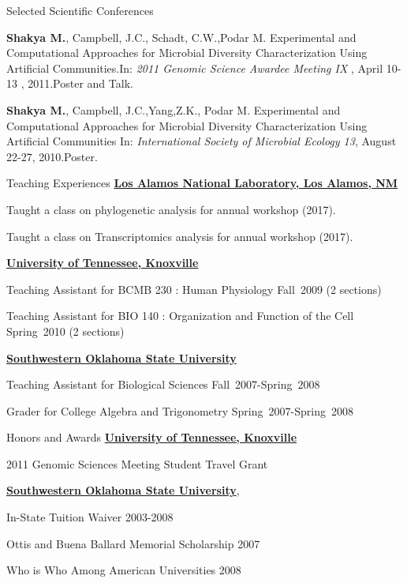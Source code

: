 \documentclass{resume} %
\begin{document}
\begin{rSection}{Selected Scientific Conferences}
\item \textbf{Shakya M.}, Campbell, J.C., Schadt, C.W.,Podar M. Experimental and Computational Approaches for Microbial Diversity Characterization Using Artificial Communities.In: \emph{2011 Genomic Science Awardee Meeting IX }, April 10-13 , 2011.Poster and Talk.

\item \textbf{Shakya M.}, Campbell, J.C.,Yang,Z.K., Podar M. Experimental and Computational Approaches for Microbial Diversity Characterization Using Artificial Communities In: \emph{International Society of Microbial Ecology 13}, August 22-27, 2010.Poster.

\end{rSection}
\newpage

\begin{rSection}{Teaching Experiences}{}{}{}
\href{http://www.lanl.gov}{\bf Los Alamos National Laboratory, Los Alamos, NM }
\item Taught a class on phylogenetic analysis for annual workshop (2017).
\item Taught a class on Transcriptomics analysis for annual workshop (2017).

\href{http://www.utk.edu}{\bf University of Tennessee, Knoxville}
\item Teaching Assistant for BCMB 230 : Human Physiology Fall~2009 (2 sections)
\item Teaching Assistant for BIO 140 : Organization and Function of the Cell  Spring~2010 (2 sections)

\href{http://www.swosu.edu}{\textbf{Southwestern Oklahoma State University}}
 \item Teaching Assistant for Biological Sciences Fall~2007-Spring~2008
\item Grader for College Algebra and Trigonometry Spring~2007-Spring~2008

\end{rSection}


\begin{rSection}{Honors and Awards}
\href{http://www.utk.edu}{\textbf{University of Tennessee, Knoxville}}
\item 2011 Genomic Sciences Meeting Student Travel Grant

\item \href{http://www.swosu.edu}{\textbf{Southwestern Oklahoma State University}},
\item In-State Tuition Waiver 2003-2008
\item Ottis and Buena Ballard Memorial Scholarship 2007
\item Who is Who Among American Universities 2008
\end{rSection}
\end{document}
